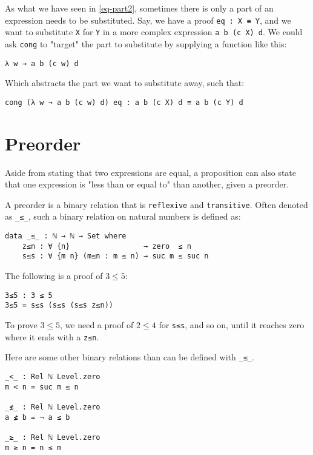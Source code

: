 \documentclass[../thesis.tex]{subfiles}
\begin{document}
As what we have seen in \ref{eq-part2}, sometimes there is only a part of an
expression needs to be substituted.
Say, we have a proof {\lstinline|eq : X ≡ Y|}, and we want to substitute {\lstinline|X|}
for {\lstinline|Y|} in a more complex expression {\lstinline|a b (c X) d|}.
We could ask {\lstinline|cong|} to "target" the part to substitute by supplying a
function like this:

\begin{lstlisting}
λ w → a b (c w) d
\end{lstlisting}

Which abstracts the part we want to substitute away, such that:

\begin{lstlisting}
cong (λ w → a b (c w) d) eq : a b (c X) d ≡ a b (c Y) d
\end{lstlisting}

\section{Preorder}

Aside from stating that two expressions are equal, a proposition can also state
that one expression is "less than or equal to" than another, given a preorder.

A preorder is a binary relation that is {\lstinline|reflexive|} and {\lstinline|transitive|}.
Often denoted as {\lstinline|_≤_|}, such a binary relation on natural numbers is
defined as:

\begin{lstlisting}
data _≤_ : ℕ → ℕ → Set where
    z≤n : ∀ {n}                 → zero  ≤ n
    s≤s : ∀ {m n} (m≤n : m ≤ n) → suc m ≤ suc n
\end{lstlisting}

The following is a proof of $ 3 \leq 5 $:

\begin{lstlisting}
3≤5 : 3 ≤ 5
3≤5 = s≤s (s≤s (s≤s z≤n))
\end{lstlisting}

To prove $ 3 \leq 5 $, we need a proof of $ 2 \leq 4 $ for {\lstinline|s≤s|},
and so on, until it reaches zero where it ends with a {\lstinline|z≤n|}.

Here are some other binary relations than can be defined with {\lstinline|_≤_|}.

\begin{lstlisting}
_<_ : Rel ℕ Level.zero
m < n = suc m ≤ n

_≰_ : Rel ℕ Level.zero
a ≰ b = ¬ a ≤ b

_≥_ : Rel ℕ Level.zero
m ≥ n = n ≤ m
\end{lstlisting}
\end{document}
